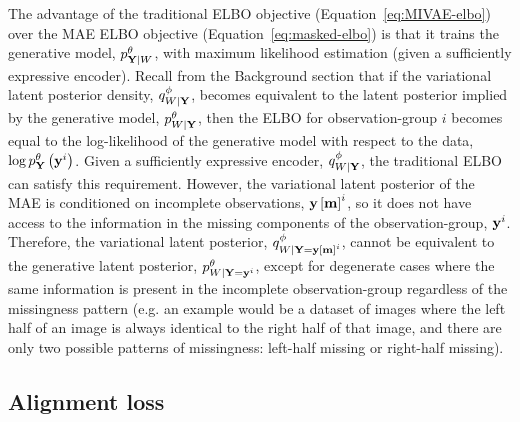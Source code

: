 \documentclass[../thesis.tex]{subfiles}
\begin{document}
The advantage of the traditional ELBO objective (Equation~\ref{eq:MIVAE-elbo}) over the MAE ELBO objective (Equation~\ref{eq:masked-elbo}) is that it trains the generative model, $\myfunc{p}^{\theta}_{\mygroup{\myrv{y}} | \myrv{w}}$, with maximum likelihood estimation (given a sufficiently expressive encoder). Recall from the Background section that if the variational latent posterior density, $\myfunc{q}^{\phi}_{\myrv{w} | \mygroup{\myrv{y}}}$, becomes equivalent to the latent posterior implied by the generative model, $\myfunc{p}^{\theta}_{\myrv{w} | \mygroup{\myrv{y}}}$, then the ELBO for observation-group $i$ becomes equal to the log-likelihood of the generative model with respect to the data, $\log \myfunc{p}^{\theta}_{\mygroup{\myrv{y}}} \left( \mygroup{\myvect{y}}^i \right)$. Given a sufficiently expressive encoder, $\myfunc{q}^{\phi}_{\myrv{w} | \mygroup{\myrv{y}}}$, the traditional ELBO can satisfy this requirement. However, the variational latent posterior of the MAE is conditioned on incomplete observations, $\mathbf{{y}} \left[ \mathbf{{m}} \right]^i$, so it does not have access to the information in the missing components of the observation-group, $\mathbf{{y}}^i$. Therefore, the variational latent posterior, $\myfunc{q}^{\phi}_{\myrv{w} | \mygroup{\myrv{y}} = \mygroup{\myvect{y}} \left[ \mygroup{\myvect{m}} \right]^i}$, cannot be equivalent to the generative latent posterior, $\myfunc{p}^{\theta}_{\myrv{w} | \mygroup{\myrv{y}} = \mygroup{\myvect{y}}^i}$, except for degenerate cases where the same information is present in the incomplete observation-group regardless of the missingness pattern (e.g. an example would be a dataset of images where the left half of an image is always identical to the right half of that image, and there are only two possible patterns of missingness: left-half missing or right-half missing).

\subsection{Alignment loss} 
\end{document}
